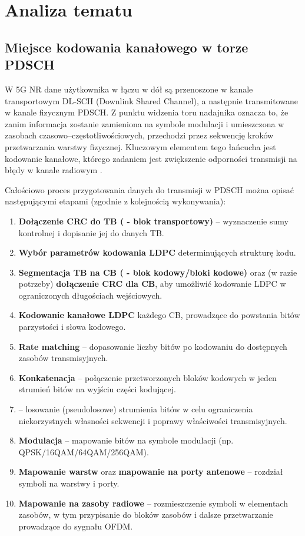 \chapter{Analiza tematu}
\label{ch:analiza}

\section{Miejsce kodowania kanałowego w torze PDSCH}
\label{sec:analiza_kontekst}

W 5G NR dane użytkownika w łączu w dół są przenoszone w kanale transportowym DL-SCH (Downlink Shared Channel), a następnie transmitowane w kanale fizycznym PDSCH. Z punktu widzenia toru nadajnika oznacza to, że zanim informacja zostanie zamieniona na symbole modulacji i umieszczona w zasobach czasowo--częstotliwościowych, przechodzi przez sekwencję kroków przetwarzania warstwy fizycznej. Kluczowym elementem tego łańcucha jest kodowanie kanałowe, którego zadaniem jest zwiększenie odporności transmisji na błędy w kanale radiowym \cite{bib:3gpp_38212}.

Całościowo proces przygotowania danych do transmisji w PDSCH można opisać następującymi etapami (zgodnie z kolejnością wykonywania):
\begin{enumerate}
  \item \textbf{Dołączenie CRC do TB ( - blok transportowy)} -- wyznaczenie sumy kontrolnej i dopisanie jej do danych TB.
  \item \textbf{Wybór parametrów kodowania LDPC} determinujących strukturę kodu.
  \item \textbf{Segmentacja TB na CB ( - blok kodowy/bloki kodowe)} oraz (w razie potrzeby) \textbf{dołączenie CRC dla CB}, aby umożliwić kodowanie LDPC w ograniczonych długościach wejściowych.
  \item \textbf{Kodowanie kanałowe LDPC} każdego CB, prowadzące do powstania bitów parzystości i słowa kodowego.
  \item \textbf{Rate matching} -- dopasowanie liczby bitów po kodowaniu do dostępnych zasobów transmisyjnych.
  \item \textbf{Konkatenacja} -- połączenie przetworzonych bloków kodowych w jeden strumień bitów na wyjściu części kodującej.
  \item \textbf{} -- losowanie (pseudolosowe) strumienia bitów w celu ograniczenia niekorzystnych własności sekwencji i poprawy właściwości transmisyjnych.
  \item \textbf{Modulacja} -- mapowanie bitów na symbole modulacji (np. QPSK/16QAM/64QAM/256QAM).
  \item \textbf{Mapowanie warstw} oraz \textbf{mapowanie na porty antenowe} -- rozdział symboli na warstwy i porty.
  \item \textbf{Mapowanie na zasoby radiowe} -- rozmieszczenie symboli w elementach zasobów, w tym przypisanie do bloków zasobów i dalsze przetwarzanie prowadzące do sygnału OFDM.
\end{enumerate}

